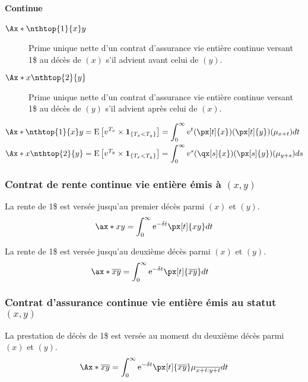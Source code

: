 \documentclass[10pt, french]{article}
\begin{document}
\begin{multicols*}{2}
\paragraph*{Continue}
\begin{distributions}[Notation]
\begin{description}
	\item[$\Ax*{\nthtop{1}{x}y}$]	Prime unique nette d'un contrat d'assurance vie entière continue versant 1\$ au décès de $(x)$ s'il advient avant celui de $(y)$.
	\item[$\Ax*{x\nthtop{2}{y}}$]	Prime unique nette d'un contrat d'assurance vie entière continue versant 1\$ au décès de $(y)$ s'il advient après celui de $(x)$.
\end{description}
\end{distributions}
\begin{align*}
	\Ax*{\nthtop{1}{x}y}
	&=	\esp{v^{T_{x}} \times \bm{1}_{\{T_{x} < T_{y}\}}}
	=	\int_{0}^{\infty} v^{t} (\px[t]{x})(\px[t]{y})(\mu_{x + t})dt	\\
	\Ax*{x\nthtop{2}{y}}
	&=	\esp{v^{T_{y}} \times \bm{1}_{\{T_{x} < T_{y}\}}}
	=	\int_{0}^{\infty} v^{s} (\qx[s]{x})(\px[s]{y})(\mu_{y + s})ds
\end{align*}
\subsubsection*{Contrat de rente continue vie entière émis à $(x, y)$}

La rente de 1\$ est versée jusqu'au premier décès parmi $(x)$ et $(y)$.
\begin{align*}
	\ax*{xy}
	&=	\int_{0}^{\infty} \textrm{e}^{-\delta t} \px[t]{xy} dt	\\
\end{align*}

La rente de 1\$ est versée jusqu'au deuxième décès parmi $(x)$ et $(y)$.
\begin{align*}
	\ax*{\overline{xy}}
	&=	\int_{0}^{\infty} \textrm{e}^{-\delta t} \px[t]{\overline{xy}} dt	
\end{align*}


\subsubsection*{Contrat d'assurance continue vie entière émis au statut $(x, y)$}
La prestation de décès de 1\$ est versée au moment du deuxième décès parmi $(x)$ et $(y)$.
\begin{align*}
	\Ax*{\overline{xy}}
	&=	\int_{0}^{\infty} \textrm{e}^{-\delta t} \px[t]{\overline{xy}} \mu_{\overline{x + t : y + t}} dt	\\
\end{align*}


\end{multicols*}
\end{document}
